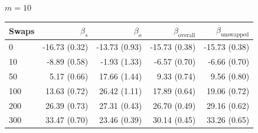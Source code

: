 \begin{table}[H]
\begin{tabular}{l rrrr}
\bottomrule
\end{tabular}
\par\medskip
\noindent\textit{$m = 10$}\\[2pt]
\begin{tabular}{l rrrr}
\toprule
Swaps & $\beta_s$ & $\beta_o$ & $\beta_{\mathrm{overall}}$ & $\beta_{\mathrm{unswapped}}$ \\
\midrule
0 & -16.73 (0.32) & -13.73 (0.93) & -15.73 (0.38) & -15.73 (0.38) \\
10 & -8.89 (0.58) & -1.93 (1.33) & -6.57 (0.70) & -6.66 (0.70) \\
50 & 5.17 (0.66) & 17.66 (1.44) & 9.33 (0.74) & 9.56 (0.80) \\
100 & 13.63 (0.72) & 26.42 (1.11) & 17.89 (0.64) & 19.06 (0.72) \\
200 & 26.39 (0.73) & 27.31 (0.43) & 26.70 (0.49) & 29.16 (0.62) \\
300 & 33.47 (0.70) & 23.46 (0.39) & 30.14 (0.45) & 33.26 (0.65) \\
\bottomrule
\end{tabular}
\end{table}

